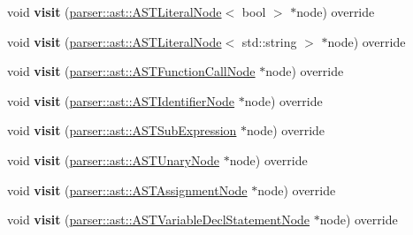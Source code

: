 \begin{DoxyCompactItemize}
void {\bfseries visit} (\hyperlink{classparser_1_1ast_1_1ASTLiteralNode}{parser\+::ast\+::\+A\+S\+T\+Literal\+Node}$<$ bool $>$ $\ast$node) override
\item 
\mbox{\label{classvisitor_1_1InterpreterVisitor_a19398633cd2c6170012b31ab6a409ddd}} 
void {\bfseries visit} (\hyperlink{classparser_1_1ast_1_1ASTLiteralNode}{parser\+::ast\+::\+A\+S\+T\+Literal\+Node}$<$ std\+::string $>$ $\ast$node) override
\item 
\mbox{\label{classvisitor_1_1InterpreterVisitor_af4c36582bc131f24b21473a2ad3863e2}} 
void {\bfseries visit} (\hyperlink{classparser_1_1ast_1_1ASTFunctionCallNode}{parser\+::ast\+::\+A\+S\+T\+Function\+Call\+Node} $\ast$node) override
\item 
\mbox{\label{classvisitor_1_1InterpreterVisitor_a74cc15ec03e36832293260a4d044a754}} 
void {\bfseries visit} (\hyperlink{classparser_1_1ast_1_1ASTIdentifierNode}{parser\+::ast\+::\+A\+S\+T\+Identifier\+Node} $\ast$node) override
\item 
\mbox{\label{classvisitor_1_1InterpreterVisitor_a18bc942a7ebfcdaa5dad72c74217afbd}} 
void {\bfseries visit} (\hyperlink{classparser_1_1ast_1_1ASTSubExpression}{parser\+::ast\+::\+A\+S\+T\+Sub\+Expression} $\ast$node) override
\item 
\mbox{\label{classvisitor_1_1InterpreterVisitor_a78ae6427ebd645e999cca5633ed550a8}} 
void {\bfseries visit} (\hyperlink{classparser_1_1ast_1_1ASTUnaryNode}{parser\+::ast\+::\+A\+S\+T\+Unary\+Node} $\ast$node) override
\item 
\mbox{\label{classvisitor_1_1InterpreterVisitor_a96c185b01435b7235556b4b8f143a7e9}} 
void {\bfseries visit} (\hyperlink{classparser_1_1ast_1_1ASTAssignmentNode}{parser\+::ast\+::\+A\+S\+T\+Assignment\+Node} $\ast$node) override
\item 
\mbox{\label{classvisitor_1_1InterpreterVisitor_a0df27eef74e21ae2dfe5936cc2204fea}} 
void {\bfseries visit} (\hyperlink{classparser_1_1ast_1_1ASTVariableDeclStatementNode}{parser\+::ast\+::\+A\+S\+T\+Variable\+Decl\+Statement\+Node} $\ast$node) override

\end{DoxyCompactItemize}
